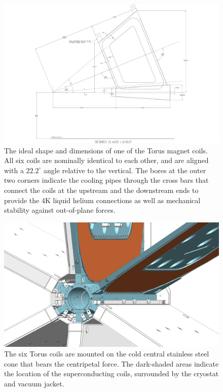 \documentclass[final,3p,twocolumn]{elsarticle}
\begin{document}
\begin{figure}[htbp!]
\centerline{\includegraphics[width=1.40\columnwidth]{clas12_desired.pdf}}
\caption{\footnotesize The ideal shape and dimensions of one of the Torus magnet coils. All six coils are nominally identical to each other, and are aligned with a $22.2^\circ$ angle relative to the vertical. The bores at the outer two corners indicate the cooling pipes through the
cross bars that connect the coils at the upstream and the downstream ends to provide the 4K liquid helium connections as well as mechanical stability against out-of-plane forces. }
\label{coil-shape}
\end{figure}
\begin{figure}[htbp!]
\centerline{\includegraphics[width=1.00\columnwidth]{torus-hub-2.png}}
\caption{\footnotesize The six Torus coils are mounted on the cold central stainless steel cone that bears the centripetal force. The dark-shaded areas indicate the location of the superconducting coils, surrounded by the cryostat and vacuum jacket.}
\label{coil-mount}
\end{figure}
\end{document}
